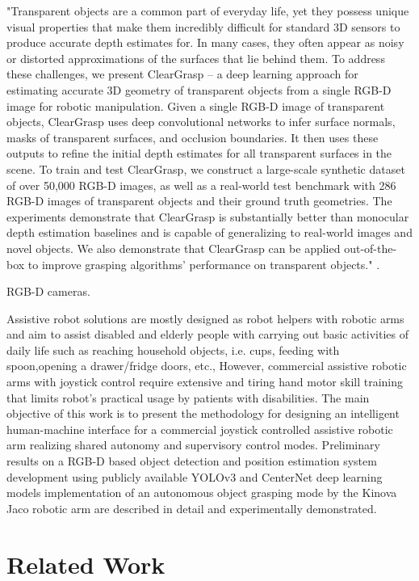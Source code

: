 "Transparent objects are a common part of everyday life, yet they possess unique visual properties that make them incredibly difficult for standard 3D sensors to produce accurate depth estimates for. In many cases, they often appear as noisy or distorted approximations of the surfaces that lie behind them. To address these challenges, we present ClearGrasp -- a deep learning approach for estimating accurate 3D geometry of transparent objects from a single RGB-D image for robotic manipulation. Given a single RGB-D image of transparent objects, ClearGrasp uses deep convolutional networks to infer surface normals, masks of transparent surfaces, and occlusion boundaries. It then uses these outputs to refine the initial depth estimates for all transparent surfaces in the scene. To train and test ClearGrasp, we construct a large-scale synthetic dataset of over 50,000 RGB-D images, as well as a real-world test benchmark with 286 RGB-D images of transparent objects and their ground truth geometries. The experiments demonstrate that ClearGrasp is substantially better than monocular depth estimation baselines and is capable of generalizing to real-world images and novel objects. We also demonstrate that ClearGrasp can be applied out-of-the-box to improve grasping algorithms' performance on transparent objects." \cite{sajjan2019cleargrasp}.

RGB-D cameras.

\cite{RakhimkulEtAl2019} Assistive robot solutions are mostly designed as robot helpers with robotic arms and aim to assist disabled and elderly people with carrying out basic activities of daily life such as reaching household objects, i.e. cups, feeding with spoon,opening a drawer/fridge doors, etc., However, commercial assistive robotic arms with joystick control require extensive and tiring hand motor skill training that limits robot’s practical usage by patients with disabilities. The main objective of this work is to present the methodology for designing an intelligent human-machine interface for a commercial joystick controlled assistive robotic arm realizing shared autonomy and supervisory control modes. Preliminary results on a RGB-D based object detection and position estimation system development using publicly available YOLOv3 and CenterNet deep learning models implementation of an autonomous object grasping mode by the Kinova Jaco robotic arm are described in detail and experimentally demonstrated.



\section{Related Work}
\label{context:related-work} 






